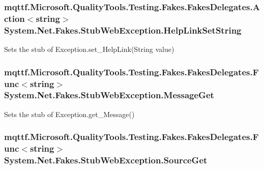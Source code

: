 \hypertarget{class_system_1_1_net_1_1_fakes_1_1_stub_web_exception_ab9a0014ad29603e484068fbc5b7a754b}{
\subsubsection[{Help\-Link\-Set\-String}]{\setlength{\rightskip}{0pt plus 5cm}mqttf.\-Microsoft.\-Quality\-Tools.\-Testing.\-Fakes.\-Fakes\-Delegates.\-Action$<$string$>$ System.\-Net.\-Fakes.\-Stub\-Web\-Exception.\-Help\-Link\-Set\-String}}\label{class_system_1_1_net_1_1_fakes_1_1_stub_web_exception_ab9a0014ad29603e484068fbc5b7a754b}


Sets the stub of Exception.\-set\-\_\-\-Help\-Link(\-String value)

\hypertarget{class_system_1_1_net_1_1_fakes_1_1_stub_web_exception_ab706ef17d1bda0c8c2669b6c2b079821}{
\subsubsection[{Message\-Get}]{\setlength{\rightskip}{0pt plus 5cm}mqttf.\-Microsoft.\-Quality\-Tools.\-Testing.\-Fakes.\-Fakes\-Delegates.\-Func$<$string$>$ System.\-Net.\-Fakes.\-Stub\-Web\-Exception.\-Message\-Get}}\label{class_system_1_1_net_1_1_fakes_1_1_stub_web_exception_ab706ef17d1bda0c8c2669b6c2b079821}


Sets the stub of Exception.\-get\-\_\-\-Message()

\hypertarget{class_system_1_1_net_1_1_fakes_1_1_stub_web_exception_ac46d658eedb9f8eece2e420a11fbd373}{
\subsubsection[{Source\-Get}]{\setlength{\rightskip}{0pt plus 5cm}mqttf.\-Microsoft.\-Quality\-Tools.\-Testing.\-Fakes.\-Fakes\-Delegates.\-Func$<$string$>$ System.\-Net.\-Fakes.\-Stub\-Web\-Exception.\-Source\-Get}}\label{class_system_1_1_net_1_1_fakes_1_1_stub_web_exception_ac46d658eedb9f8eece2e420a11fbd373}



